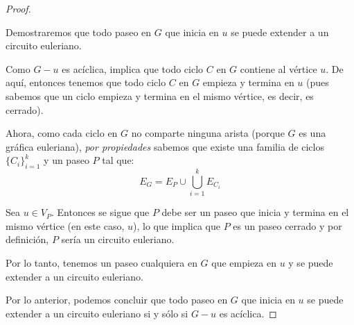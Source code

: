 \documentclass{article}
\begin{document}
\begin{enumerate}
\begin{proof}
\begin{itemize}
        Demostraremos que todo paseo en $G$ que inicia en $u$ se puede extender a un circuito euleriano.

        Como $G - u$ es acíclica, implica que todo ciclo $C$ en $G$ contiene al vértice $u$. De aquí, entonces tenemos que todo ciclo $C$ en $G$ empieza y termina en $u$ (pues sabemos que un ciclo empieza y termina en el mismo vértice, es decir, es cerrado).

        Ahora, como cada ciclo en $G$ no comparte ninguna arista (porque $G$ es una gráfica euleriana), \textit{por propiedades} sabemos que existe una familia de ciclos $\bigg\{ C_{i}\bigg\}_{i = 1}^{k}$ y un paseo $P$ tal que:
        $$E_{G} = E_{P} \cup \bigcup_{i = 1}^{k} E_{C_{i}}$$

        Sea $u \in V_{P}$. Entonces se sigue que $P$ debe ser un paseo que inicia y termina en el mismo vértice (en este caso, $u$), lo que implica que $P$ es un paseo cerrado y por definición, $P$ sería un circuito euleriano.

        Por lo tanto, tenemos un paseo cualquiera en $G$ que empieza en $u$ y se puede extender a un circuito euleriano.
    \end{itemize}

    Por lo anterior, podemos concluir que todo paseo en $G$ que inicia en $u$ se puede extender a un circuito euleriano si y s\'olo si $G-u$ es ac\'iclica.
  \end{proof}
\end{enumerate}
\end{document}
